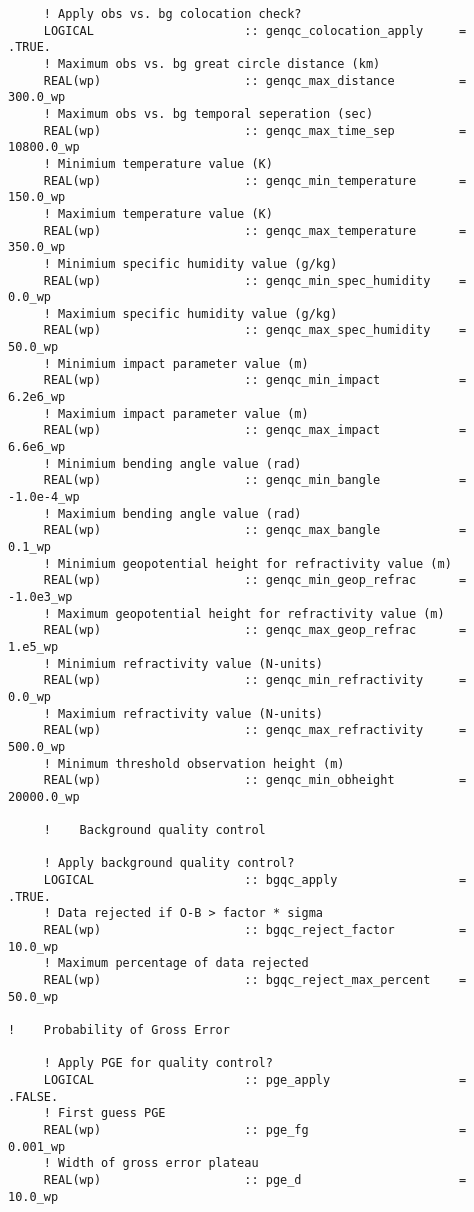 \begin{Verbatim}
     ! Apply obs vs. bg colocation check?
     LOGICAL                     :: genqc_colocation_apply     = .TRUE.      
     ! Maximum obs vs. bg great circle distance (km)
     REAL(wp)                    :: genqc_max_distance         = 300.0_wp    
     ! Maximum obs vs. bg temporal seperation (sec)
     REAL(wp)                    :: genqc_max_time_sep         = 10800.0_wp    
     ! Minimium temperature value (K)
     REAL(wp)                    :: genqc_min_temperature      = 150.0_wp
     ! Maximium temperature value (K)
     REAL(wp)                    :: genqc_max_temperature      = 350.0_wp
     ! Minimium specific humidity value (g/kg)
     REAL(wp)                    :: genqc_min_spec_humidity    =  0.0_wp
     ! Maximium specific humidity value (g/kg)
     REAL(wp)                    :: genqc_max_spec_humidity    = 50.0_wp
     ! Minimium impact parameter value (m)
     REAL(wp)                    :: genqc_min_impact           = 6.2e6_wp   
     ! Maximium impact parameter value (m)
     REAL(wp)                    :: genqc_max_impact           = 6.6e6_wp  
     ! Minimium bending angle value (rad)
     REAL(wp)                    :: genqc_min_bangle           = -1.0e-4_wp
     ! Maximium bending angle value (rad)
     REAL(wp)                    :: genqc_max_bangle           =  0.1_wp 
     ! Minimium geopotential height for refractivity value (m)
     REAL(wp)                    :: genqc_min_geop_refrac      = -1.0e3_wp
     ! Maximum geopotential height for refractivity value (m)
     REAL(wp)                    :: genqc_max_geop_refrac      = 1.e5_wp  
     ! Minimium refractivity value (N-units)
     REAL(wp)                    :: genqc_min_refractivity     = 0.0_wp 
     ! Maximium refractivity value (N-units)
     REAL(wp)                    :: genqc_max_refractivity     = 500.0_wp  
     ! Minimum threshold observation height (m)
     REAL(wp)                    :: genqc_min_obheight         = 20000.0_wp

     !    Background quality control

     ! Apply background quality control?
     LOGICAL                     :: bgqc_apply                 = .TRUE.    
     ! Data rejected if O-B > factor * sigma
     REAL(wp)                    :: bgqc_reject_factor         = 10.0_wp    
     ! Maximum percentage of data rejected
     REAL(wp)                    :: bgqc_reject_max_percent    = 50.0_wp     

!    Probability of Gross Error

     ! Apply PGE for quality control?
     LOGICAL                     :: pge_apply                  = .FALSE.    
     ! First guess PGE
     REAL(wp)                    :: pge_fg                     = 0.001_wp  
     ! Width of gross error plateau
     REAL(wp)                    :: pge_d                      = 10.0_wp   


\end{Verbatim}

